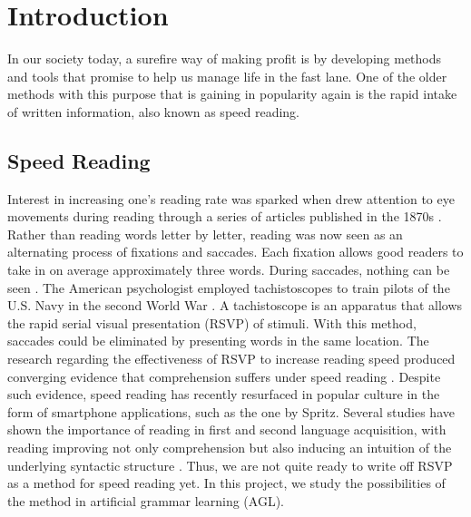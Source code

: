 \section{Introduction}
In our society today, a surefire way of making profit is by developing methods and tools that promise to help us manage life in the fast lane. One of the older methods with this purpose that is gaining in popularity again is the rapid intake of written information, also known as speed reading.
\subsection{Speed Reading} 
Interest in increasing one's reading rate was sparked when \citeauthor{javal1879essai} drew attention to eye movements during reading through a series of articles published in the 1870s \citep{javal1879essai, huey1908psychology, wade2009did}. Rather than reading words letter by letter, reading was now seen as an alternating process of fixations and saccades. Each fixation allows good readers to take in on average approximately three words. During saccades, nothing can be seen \citep{ahuja1995increase}. The American psychologist \citeauthor{renshaw1945visual} employed tachistoscopes to train pilots of the U.S. Navy in the second World War \citep{godnig2003tachi, benschop1998tachistoscope, renshaw1945visual}. A tachistoscope is an apparatus that allows the rapid serial visual presentation (RSVP) of stimuli. With this method, saccades could be eliminated by presenting words in the same location. 
The research regarding the effectiveness of RSVP to increase reading speed produced converging evidence that comprehension suffers under speed reading \citep{swalm1973speed, witty1969rate, causey1954colleges, bormuth1961tachistoscope, mcconkie1973experimental, schotter2014don}. Despite such evidence, speed reading has recently resurfaced in popular culture in the form of smartphone applications, such as the one by Spritz. Several studies have shown the importance of reading in first and second language acquisition, with reading improving not only comprehension but also inducing an intuition of the underlying syntactic structure \citep{chomsky1972stages, siegel1988development,krashen1993power}. Thus, we are not quite ready to write off RSVP as a method for speed reading yet. In this project, we study the possibilities of the method in artificial grammar learning (AGL).


